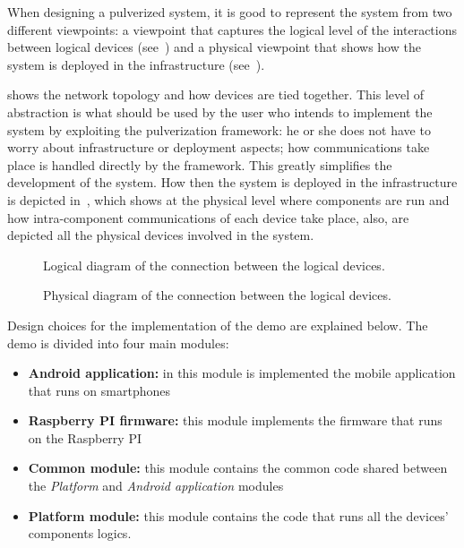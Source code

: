 When designing a pulverized system, it is good to represent the system from two different viewpoints: a viewpoint that captures the logical level
of the interactions between logical devices (see~) and a physical viewpoint that shows how the system is deployed in
the infrastructure (see~).

 shows the network topology and how devices are tied together. This level of abstraction is what should be used by
the user who intends to implement the system by exploiting the pulverization framework: he or she does not have to worry about infrastructure or
deployment aspects; how communications take place is handled directly by the framework. This greatly simplifies the development of the system. How
then the system is deployed in the infrastructure is depicted in~, which shows at the physical level where
components are run and how intra-component communications of each device take place, also, are depicted all the physical devices involved in the
system.

\begin{figure}
	\centering
	\caption{Logical diagram of the connection between the logical devices.}
	\label{fig:demo-2-logical-diagram}
\end{figure}

\begin{figure}
	\centering
	\caption{Physical diagram of the connection between the logical devices.}
	\label{fig:demo-2-physical-diagram}
\end{figure}

Design choices for the implementation of the demo are explained below. The demo is divided into four main modules:

\begin{itemize}
	\item \textbf{Android application:} in this module is implemented the mobile application that runs on smartphones
	\item \textbf{Raspberry PI firmware:} this module implements the firmware that runs on the Raspberry PI
	\item \textbf{Common module:} this module contains the common code shared between the \emph{Platform} and \emph{Android application} modules
	\item \textbf{Platform module:} this module contains the code that runs all the devices' components logics.
\end{itemize}

